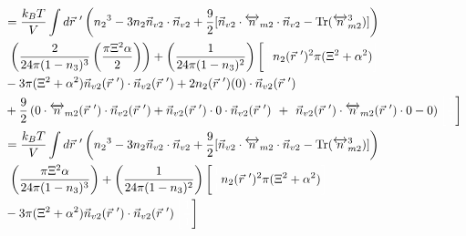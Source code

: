 \documentclass[double,12pt]{revtex4-2}
\begin{document}
\begin{align} %
%
&=\frac{k_BT}{V}\int d\vec r~' \left( {n_2}^3-3n_2
    \vec{n}_{v2}\cdot\vec{n}_{v2} 
     +\frac{9}{2}[\vec{n}_{v2}\cdot{\overleftrightarrow{n}_{m2}}\cdot{
     \vec{n}_{v2}}-\operatorname{Tr}({\overleftrightarrow{n}^3_{m2}})]
     \right) \nonumber\\
     &~\left(\frac{2}{24\pi(1-n_3)^3}\left(\frac{\pi\Xi^2\alpha}{2}\right)
     \right) + \left(\frac{1}{24\pi(1-n_3)^2}\right)\left[\color{white}
     \frac{1}{1}\color{black}n_2(\vec r~')^2
     \pi(\Xi^2 + \alpha^2) \color{white}\right] \nonumber\\
     &- 3\pi(\Xi^2 + \alpha^2)\vec n_{v2}(\vec r~') \cdot \vec n_{v2}
     (\vec r~') + 2n_2(\vec r~')(0)\cdot \vec n_{v2}(\vec r~')\nonumber \\
     &+\frac{9}{2}\left(0\cdot \overleftrightarrow n_{m2}(\vec r~')\cdot 
     \vec n_{v2}( \vec r~')+\vec n_{v2}(\vec r~')\cdot 0 \cdot \vec n_{v2}
     (\vec r~')\color{white}\right)+ \color{white}\left(\color{black}
     \vec n_{v2}(\vec r~')\cdot\overleftrightarrow n_{m2}(\vec r~')
     \cdot 0-0\right) 
     \color{white}\left[\frac{1}{1}\color{black}\right] \\
%
&=\frac{k_BT}{V}\int d\vec r~' \left({n_2}^3-3n_2
   \vec{n}_{v2}\cdot\vec{n}_{v2} 
    +\frac{9}{2}[\vec{n}_{v2}\cdot{\overleftrightarrow{n}_{m2}}\cdot{
    \vec{n}_{v2}}-\operatorname{Tr}({\overleftrightarrow{n}^3_{m2}})]
    \right) \nonumber\\
    &~\left(\frac{\pi\Xi^2\alpha}{24\pi(1-n_3)^3}
    \right) + \left(\frac{1}{24\pi(1-n_3)^2}\right)\left[\color{white}
    \frac{1}{1}\color{black}n_2(\vec r~')^2
    \pi(\Xi^2 + \alpha^2) \color{white}\right] \\
    &- 3\pi(\Xi^2 + \alpha^2)\vec n_{v2}
    (\vec r~') \cdot \vec n_{v2}(\vec r~')
    \color{white}\left[\frac{1}{1}\color{black}\right]
\end{align}
\end{document}
